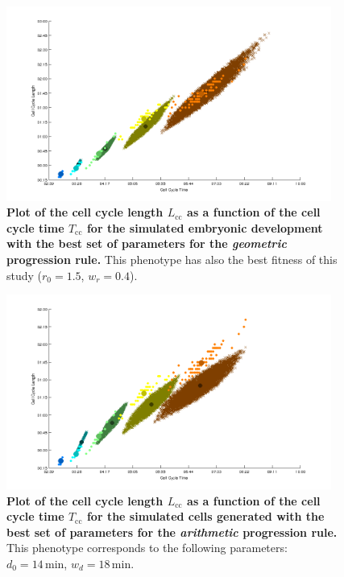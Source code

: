 \begin{figure}
\begin{center}
\includegraphics[width=0.95\textwidth]{../../images/Cases_Studies/Case_1_Division/071222bF_t_selection_1_all_T_121224_best_fitness_geo_c1_1.5_c2_0.4.png}
\end{center}
\caption{\textbf{Plot of the cell cycle length $L_{\mathrm{cc}}$ as a function of the cell cycle time $T_{\mathrm{cc}}$ for the simulated embryonic development with the best set of parameters for the \textit{geometric} progression rule.} This phenotype has also the best fitness of this study ($r_0 = 1.5$, $w_r = 0.4$).}
\label{071222bF_t_selection_1_all_T_121224_best_fitness_geo_c1_1.5_c2_0.4}
\end{figure}
\begin{figure}
\begin{center}
\includegraphics[width=0.95\textwidth]{../../images/Cases_Studies/Case_1_Division/071222bF_t_selection_1_all_T_121224_best_fitness_ari_c1_140_c2_180.png}
\end{center}
\caption{\textbf{Plot of the cell cycle length $L_{\mathrm{cc}}$ as a function of the cell cycle time $T_{\mathrm{cc}}$ for the simulated cells generated with the best set of parameters for the \textit{arithmetic} progression rule.} This phenotype corresponds to the following parameters: $d_0 = 14\,\mathrm{min}$, $w_d = 18\,\mathrm{min}$.}
\label{071222bF_t_selection_1_all_T_121224_best_fitness_ari_c1_140_c2_180}
\end{figure}



